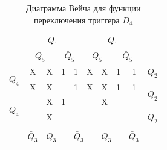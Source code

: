 \documentclass[a4paper,14pt]{article}
\begin{document}

\begin{table}[H]
	\begin{center}
		\caption{\label{tab:D4_tab} Диаграмма Вейча для функции переключения триггера $D_4$ }
		\begin{tabular}{cccccccccc}
			& \multicolumn{4}{c}{$Q_1$} & \multicolumn{4}{c}{$\bar{Q}_1$} &  \\
			& \multicolumn{2}{c}{$Q_5$} & \multicolumn{2}{c}{$\bar{Q}_5$} & \multicolumn{2}{c}{$Q_5$} & \multicolumn{2}{c}{$\bar{Q}_5$} &  \\ \cline{2-9}
			\multicolumn{1}{c|}{\multirow{2}{*}{$Q_4$}} & \multicolumn{1}{c|}{X} & \multicolumn{1}{c|}{X} & \multicolumn{1}{c|}{1} & \multicolumn{1}{c|}{1} & \multicolumn{1}{c|}{X} & \multicolumn{1}{c|}{X} & \multicolumn{1}{c|}{1} & \multicolumn{1}{c|}{1} & $\bar{Q}_2$ \\ \cline{2-9}
			\multicolumn{1}{c|}{} & \multicolumn{1}{c|}{X} & \multicolumn{1}{c|}{X} & \multicolumn{1}{c|}{} & \multicolumn{1}{c|}{1} & \multicolumn{1}{c|}{X} & \multicolumn{1}{c|}{X} & \multicolumn{1}{c|}{1} & \multicolumn{1}{c|}{1} & \multirow{2}{*}{$Q_2$} \\ \cline{2-9}
			\multicolumn{1}{c|}{\multirow{2}{*}{$\bar{Q}_4$}} & \multicolumn{1}{c|}{} & \multicolumn{1}{c|}{X} & \multicolumn{1}{c|}{1} & \multicolumn{1}{c|}{} & \multicolumn{1}{c|}{} & \multicolumn{1}{c|}{X} & \multicolumn{1}{c|}{} & \multicolumn{1}{c|}{} &  \\ \cline{2-9}
			\multicolumn{1}{c|}{} & \multicolumn{1}{c|}{} & \multicolumn{1}{c|}{X} & \multicolumn{1}{c|}{} & \multicolumn{1}{c|}{} & \multicolumn{1}{c|}{} & \multicolumn{1}{c|}{} & \multicolumn{1}{c|}{} & \multicolumn{1}{c|}{} & $\bar{Q}_2$ \\ \cline{2-9}
			&  & \multicolumn{2}{c}{} & \multicolumn{2}{c}{} & \multicolumn{2}{c}{} &  &  \\
			\multicolumn{1}{l}{} & \multicolumn{1}{l}{$\bar{Q}_3$} & \multicolumn{2}{l}{$Q_3$} & \multicolumn{2}{l}{$\bar{Q}_3$} & \multicolumn{2}{l}{$Q_3$} & \multicolumn{1}{l}{$\bar{Q}_3$} & \multicolumn{1}{l}{}
		\end{tabular}
	\end{center}
\end{table}

\end{document}
